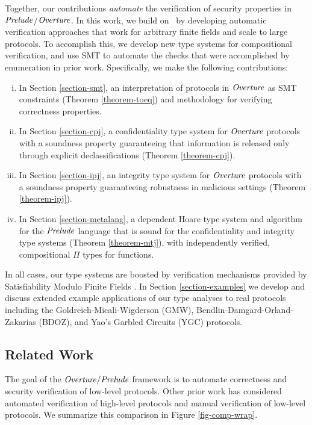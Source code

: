 Together, our contributions \emph{automate} the verification of security
properties in $\mathit{Prelude}$/$\mathit{Overture}$. In this work, we build on~\cite{skalka-near-ppdp24}
by developing automatic verification approaches that work for arbitrary
finite fields and scale to large protocols. To accomplish this, we develop new
type systems for compositional verification, and use SMT to automate the checks
that were accomplished by enumeration in prior work. Specifically, we make the
following contributions:
%
\begin{enumerate}[i.]
\item In Section \ref{section-smt}, an interpretation of protocols in
  $\mathit{Overture}$ as SMT constraints (Theorem \ref{theorem-toeq}) and
  methodology for verifying correctness properties.
\item In Section \ref{section-cpj}, a confidentiality type system for
  $\mathit{Overture}$ protocols with a soundness property guaranteeing that
  information is released only through explicit declassifications
  (Theorem \ref{theorem-cpj}).
\item In Section \ref{section-ipj}, an integrity type system for
  $\mathit{Overture}$ protocols with a soundness property guaranteeing
  robustness in malicious settings (Theorem \ref{theorem-ipj}).
\item In Section \ref{section-metalang}, a dependent Hoare type system and
  algorithm for the $\mathit{Prelude}$ language that is sound for the
  confidentiality and integrity type systems (Theorem
  \ref{theorem-mtj}), with independently verified, compositional $\Pi$
  types for functions.
\end{enumerate}
In all cases, our type systems are boosted by verification mechanisms
provided by Satisfiability Modulo Finite Fields \cite{SMFF}. In
Section \ref{section-examples} we develop and discuss extended example
applications of our type analyses to real protocols including
the Goldreich-Micali-Wigderson (GMW), Bendlin-Damgard-Orland-Zakarias
(BDOZ), and Yao's Garbled Circuits (YGC) protocols.

\subsection{Related Work}
\label{section-related-work}

The goal of the $\mathit{Overture}/\mathit{Prelude}$ framework is to automate
correctness and security verification of low-level protocols.  Other
prior work has considered automated verification of high-level
protocols and manual verification of low-level protocols.
We summarize this comparison in Figure \ref{fig-comp-wrap}.

